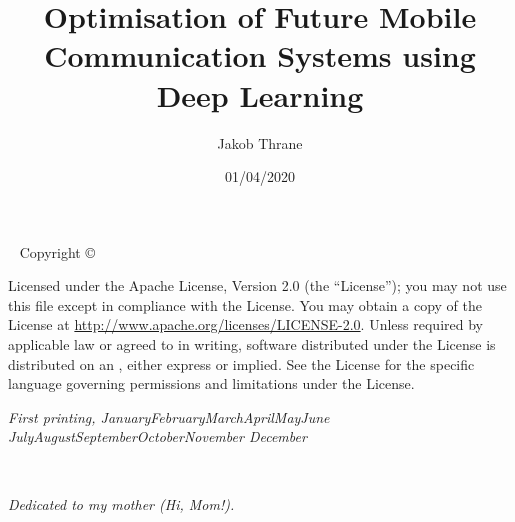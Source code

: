 \documentclass[nobib, b5paper]{tufte-book}
\title{Optimisation of Future Mobile Communication Systems using Deep Learning}
\date{01/04/2020}
\author[Jakob Thrane]{Jakob Thrane}
\newcommand{\monthyear}{%
  \ifcase\month\or January\or February\or March\or April\or May\or June\or
  July\or August\or September\or October\or November\or
  December\fi\space\number\year
}
\newcommand{\blankpage}{\newpage\hbox{}\thispagestyle{empty}\newpage}
\begin{document}
\frontmatter





\newpage
\begin{fullwidth}
~\vfill
\thispagestyle{empty}
\setlength{\parindent}{0pt}
\setlength{\parskip}{\baselineskip}
Copyright \copyright\ \the\year\ \thanklessauthor

\par{}

\par{}

\par Licensed under the Apache License, Version 2.0 (the ``License''); you may not
use this file except in compliance with the License. You may obtain a copy
of the License at \url{http://www.apache.org/licenses/LICENSE-2.0}. Unless
required by applicable law or agreed to in writing, software distributed
under the License is distributed on an , either express or implied. See the
License for the specific language governing permissions and limitations
under the License.

\par\textit{First printing, \monthyear}
\end{fullwidth}





\printglossary[type=\acronymtype, nonumberlist, title=Acronyms]

\begin{fullwidth}
\tableofcontents
\end{fullwidth}


\cleardoublepage
~\vfill
\begin{doublespace}
\noindent\fontsize{18}{22}\selectfont\itshape
\nohyphenation
Dedicated to my mother (Hi, Mom!).
\end{doublespace}
\vfill
\vfill


\cleardoublepage



\mainmatter
\end{document}
